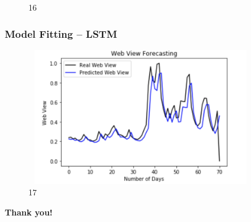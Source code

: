 \documentclass[cjk,10pt]{beamer}
\begin{document}
\begin{CJK*}{GBK}{song}
\begin{frame}
\begin{figure}[htbp]
\caption{16}
\end{figure}
       \end{frame}   
     \begin{frame}
    \frametitle{Model Fitting -- LSTM}
    \begin{figure}[htbp]
\centering
\includegraphics[height=6cm, width=10cm]{17}
\caption{17}
\end{figure}
       \end{frame}      
    
      \begin{frame} 
    \begin{center}
    \LARGE{{\color{red} {\bf Thank you!}}}
    \end{center}
    \end{frame}\end{CJK*}
\end{document}
